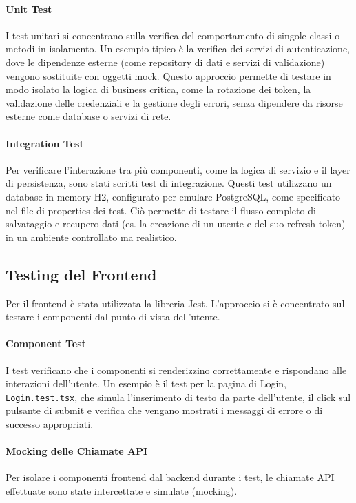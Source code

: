 \documentclass[12pt,a4paper,openright,twoside]{book}
\begin{document}
\paragraph{Unit Test} I test unitari si concentrano sulla verifica del comportamento di singole classi o metodi in isolamento. Un esempio tipico è la verifica dei servizi di autenticazione, dove le dipendenze esterne (come repository di dati e servizi di validazione) vengono sostituite con oggetti mock. Questo approccio permette di testare in modo isolato la logica di business critica, come la rotazione dei token, la validazione delle credenziali e la gestione degli errori, senza dipendere da risorse esterne come database o servizi di rete.

\paragraph{Integration Test} Per verificare l'interazione tra più componenti, come la logica di servizio e il layer di persistenza, sono stati scritti test di integrazione. Questi test utilizzano un database in-memory H2, configurato per emulare PostgreSQL, come specificato nel file di properties dei test. Ciò permette di testare il flusso completo di salvataggio e recupero dati (es. la creazione di un utente e del suo refresh token) in un ambiente controllato ma realistico.

\subsection{Testing del Frontend}
Per il frontend è stata utilizzata la libreria Jest. L'approccio si è concentrato sul testare i componenti dal punto di vista dell'utente.

\paragraph{Component Test} I test verificano che i componenti si renderizzino correttamente e rispondano alle interazioni dell'utente. Un esempio è il test per la pagina di Login, \texttt{Login.test.tsx}, che simula l'inserimento di testo da parte dell'utente, il click sul pulsante di submit e verifica che vengano mostrati i messaggi di errore o di successo appropriati.

\paragraph{Mocking delle Chiamate API} Per isolare i componenti frontend dal backend durante i test, le chiamate API effettuate sono state intercettate e simulate (mocking). 
\end{document}
